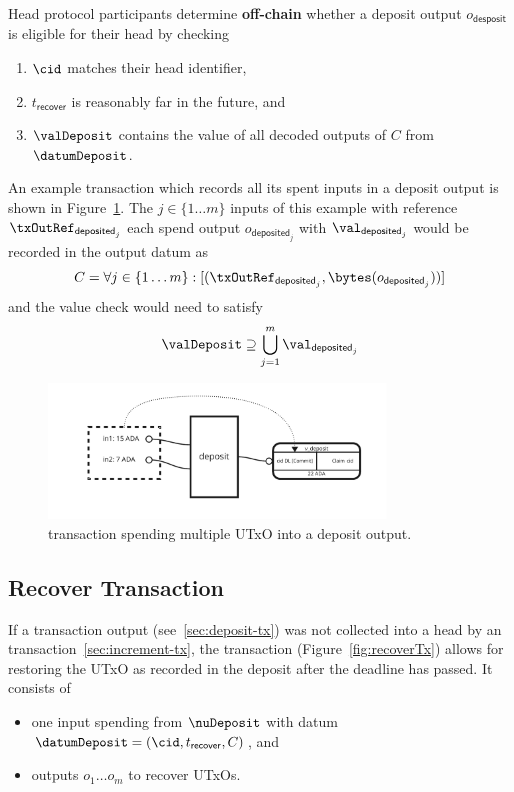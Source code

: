 \noindent Head protocol participants determine \textbf{off-chain} whether a
deposit output $o_{\mathsf{desposit}}$ is eligible for their head by checking
\begin{enumerate}
  \item $\cid$ matches their head identifier,
  \item $t_{\mathsf{recover}}$ is reasonably far in the future, and
  \item $\valDeposit$ contains the value of all decoded outputs of $C$ from $\datumDeposit$.
\end{enumerate}

\noindent An example transaction which records all its spent inputs in a deposit output is
shown in Figure~\ref{fig:depositTx}. The $j \in \{1 \dots m\}$ inputs of this example with reference $\txOutRef_{\mathsf{deposited}_{j}}$ each spend output $o_{\mathsf{deposited}_{j}}$ with $\val_{\mathsf{deposited}_{j}}$ would be recorded in the output datum as
\[
  C = \forall j \in \{1 \dots m\} : [(\txOutRef_{\mathsf{deposited}_{j}},\bytes(o_{\mathsf{deposited}_{j}}))]
\]
\noindent and the value check would need to satisfy
\[
  \valDeposit \supseteq \bigcup_{j=1}^{m} \val_{\mathsf{deposited}_{j}}
\]
\begin{figure}
  \centering
  \includegraphics[width=0.8\textwidth]{Hydra/Protocol/Figures/deposit-tx}
  \caption{\mtxDeposit{} transaction spending multiple UTxO into a deposit
	output.}\label{fig:depositTx}
\end{figure}

\subsection{Recover Transaction}\label{sec:recover-tx}

\noindent If a \mtxDeposit{} transaction output (see~\ref{sec:deposit-tx}) was
not collected into a head by an \mtxIncrement{}
transaction~\ref{sec:increment-tx}, the \mtxRecover{} transaction
(Figure~\ref{fig:recoverTx}) allows for restoring the UTxO as recorded in the
deposit after the deadline has passed. It consists of
\begin{itemize}
  \item one input spending from $\nuDeposit$ with datum $\datumDeposit = (\cid, t_{\mathsf{recover}}, C)$, and
  \item outputs $o_{1} \dots o_{m}$ to recover UTxOs.
\end{itemize}

